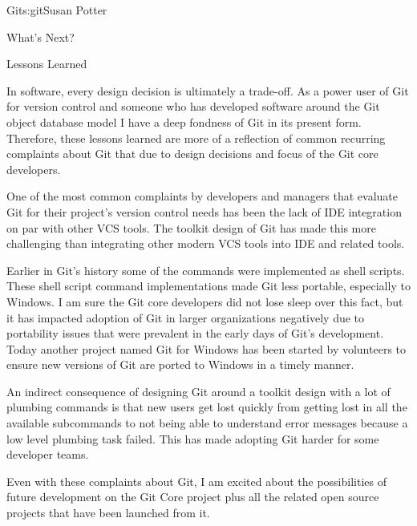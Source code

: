 \begin{aosachapter}{Git}{s:git}{Susan Potter}
\begin{aosasect1}{What's Next?}
\end{aosasect1}

\begin{aosasect1}{Lessons Learned}

In software, every design decision is ultimately a trade-off. As a power
user of Git for version control and someone who has developed software
around the Git object database model I have a deep fondness of Git in its
present form. Therefore, these lessons learned are more of a reflection
of common recurring complaints about Git that due to design decisions and
focus of the Git core developers.

One of the most common complaints by developers and managers that evaluate
Git for their project's version control needs has been the lack of IDE
integration on par with other VCS tools. The toolkit design of Git has made
this more challenging than integrating other modern VCS tools into IDE
and related tools.

Earlier in Git's history some of the commands were implemented as shell
scripts. These shell script command
implementations made Git less portable, especially to Windows. I am
sure the Git core developers did not lose sleep over this fact, but it
has impacted adoption of Git in larger organizations negatively due to
portability issues that were prevalent in the early days of Git's
development. Today another project named Git for Windows has been started
by volunteers to ensure new versions of Git are ported to Windows in a
timely manner.

An indirect consequence of designing Git around a toolkit design
with a lot of plumbing commands is that new users get lost quickly from
getting lost in all the available subcommands to not being able to
understand error messages because a low level plumbing task failed. This
has made adopting Git harder for some developer teams.

Even with these complaints about Git, I am excited about the possibilities
of future development on the Git Core project plus all the related open
source projects that have been launched from it.

\end{aosasect1}

\end{aosachapter}
